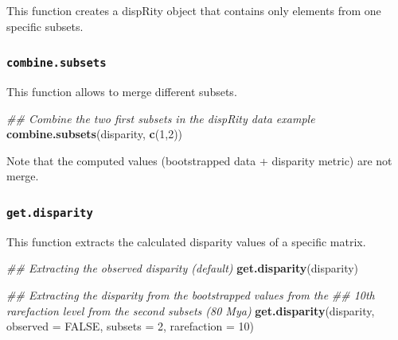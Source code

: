 \documentclass[
]{book}
\newenvironment{Shaded}{\begin{snugshade}}{\end{snugshade}}
\newcommand{\CommentTok}[1]{\textcolor[rgb]{0.56,0.35,0.01}{\textit{#1}}}
\newcommand{\DataTypeTok}[1]{\textcolor[rgb]{0.13,0.29,0.53}{#1}}
\newcommand{\DecValTok}[1]{\textcolor[rgb]{0.00,0.00,0.81}{#1}}
\newcommand{\KeywordTok}[1]{\textcolor[rgb]{0.13,0.29,0.53}{\textbf{#1}}}
\newcommand{\NormalTok}[1]{#1}
\newcommand{\OperatorTok}[1]{\textcolor[rgb]{0.81,0.36,0.00}{\textbf{#1}}}
\newcommand{\OtherTok}[1]{\textcolor[rgb]{0.56,0.35,0.01}{#1}}
\newcommand{\StringTok}[1]{\textcolor[rgb]{0.31,0.60,0.02}{#1}}
\begin{document}
This function creates a dispRity object that contains only elements from one specific subsets.

\begin{Shaded}
\end{Shaded}

\hypertarget{combine.subsets}{%
\subsubsection{\texorpdfstring{\texttt{combine.subsets}}{combine.subsets}}\label{combine.subsets}}

This function allows to merge different subsets.

\begin{Shaded}
\begin{Highlighting}[]
\CommentTok{\#\# Combine the two first subsets in the dispRity data example}
\KeywordTok{combine.subsets}\NormalTok{(disparity, }\KeywordTok{c}\NormalTok{(}\DecValTok{1}\NormalTok{,}\DecValTok{2}\NormalTok{))}
\end{Highlighting}
\end{Shaded}

Note that the computed values (bootstrapped data + disparity metric) are not merge.

\hypertarget{get.disparity}{%
\subsubsection{\texorpdfstring{\texttt{get.disparity}}{get.disparity}}\label{get.disparity}}

This function extracts the calculated disparity values of a specific matrix.

\begin{Shaded}
\begin{Highlighting}[]
\CommentTok{\#\# Extracting the observed disparity (default)}
\KeywordTok{get.disparity}\NormalTok{(disparity)}

\CommentTok{\#\# Extracting the disparity from the bootstrapped values from the}
\CommentTok{\#\# 10th rarefaction level from the second subsets (80 Mya)}
\KeywordTok{get.disparity}\NormalTok{(disparity, }\DataTypeTok{observed =} \OtherTok{FALSE}\NormalTok{, }\DataTypeTok{subsets =} \DecValTok{2}\NormalTok{, }\DataTypeTok{rarefaction =} \DecValTok{10}\NormalTok{)}
\end{Highlighting}
\end{Shaded}
\end{document}
